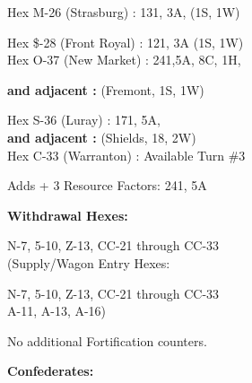 \begin{scenariodata}
Hex M-26 (Strasburg) : 131, 3A, (1S, 1W)\\
\end{scenariodata}

\begin{scenariodata}
Hex \$-28 (Front Royal) : 121, 3A (1S, 1W)\\
Hex O-37 (New Market) : 241,5A, 8C, 1H,\\
\end{scenariodata}

\begin{scenariodata}
\textbf{and adjacent :} (Fremont, 1S, 1W)\\
\end{scenariodata}

\begin{scenariodata}
Hex S-36 (Luray) : 171, 5A,\\
\textbf{and adjacent :} (Shields, 18, 2W)\\
Hex C-33 (Warranton) : Available Turn \#3\\
\end{scenariodata}

\begin{scenariodata}
Adds + 3 Resource Factors: 241, 5A\\
\end{scenariodata}

\begin{scenariodata}
\textbf{Withdrawal Hexes:}\\
\end{scenariodata}

\begin{scenariodata}
N-7, 5-10, Z-13, CC-21 through CC-33\\
(Supply/Wagon Entry Hexes:\\
\end{scenariodata}

\begin{scenariodata}
N-7, 5-10, Z-13, CC-21 through CC-33\\
A-11, A-13, A-16)\\
\end{scenariodata}

\begin{scenariodata}
No additional Fortification counters.\\
\end{scenariodata}

\begin{scenariodata}
\textbf{Confederates:}\\
\end{scenariodata}

